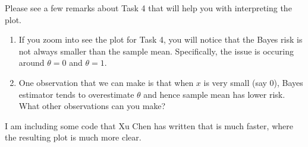 \documentclass[
]{article}
\begin{document}
Please see a few remarks about Task 4 that will help you with
interpreting the plot.

\begin{enumerate}
\item If you zoom into see the plot for Task 4, you will notice that the Bayes risk is not always smaller than the sample mean. Specifically, the issue is occuring around $\theta = 0$ and $\theta = 1.$
\item One observation that we can make is that when $x$ is very small (say 0), Bayes estimator tends to overestimate $\theta$ and hence sample mean has lower risk. What other observations can you make? 
\end{enumerate}

I am including some code that Xu Chen has written that is much faster,
where the resulting plot is much more clear.
\end{document}
